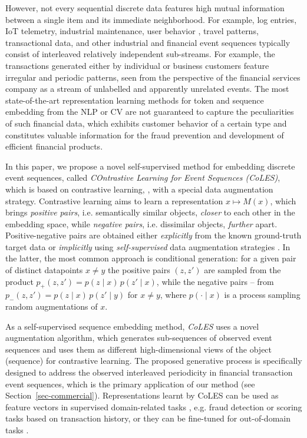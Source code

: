 \documentclass[sigconf, anonymous]{acmart}
\begin{document}
However, not every sequential discrete data features high mutual information between a single
item and its immediate neighborhood. For example, log entries, IoT telemetry, industrial
maintenance, user behavior \citep{Ni2018PerceiveYU}, travel patterns, transactional data,
and other industrial and financial event sequences typically consist of interleaved relatively
independent sub-streams.
%
For example, the transactions generated either by individual or business customers feature
irregular and periodic patterns, seen from the perspective of the financial services company
as a stream of unlabelled and apparently unrelated events. The most state-of-the-art
representation learning methods for token and sequence embedding from the NLP or CV are
not guaranteed to capture the peculiarities of such financial data, which exhibits customer
behavior of a certain type and constitutes valuable information for the fraud prevention
and development of efficient financial products.

In this paper, we propose a novel self-supervised method for embedding discrete event
sequences, called \emph{COntrastive Learning for Event Sequences (CoLES)}, which is based
on contrastive learning, \citep{Xing2002DistanceML, Hadsell2006DimensionalityRB}, with
a special data augmentation strategy.
% 
Contrastive learning aims to learn a representation $x \mapsto M(x)$, which brings
\emph{positive pairs}, i.e. semantically similar objects, \emph{closer} to each other
in the embedding space, while \emph{negative pairs}, i.e. dissimilar objects, \emph{further}
apart.
%
Positive-negative pairs are obtained either \emph{explicitly} from the known ground-truth
target data or \emph{implicitly} using \emph{self-supervised} data augmentation strategies
\citep{Falcon2020AFF}. In the latter, the most common approach is conditional generation:
for a given pair of distinct datapoints $x \neq y$ the positive pairs $(z, z')$ are sampled
from the product $
  p_+(z, z') = p(z \mid x) \,p(z' \mid x) 
$, while the negative pairs -- from $
  p_-(z, z') = p(z \mid x) \,p(z' \mid y)
$ for $x \neq y$, where $
  p(\cdot \mid x)
$ is a process sampling random augmentations of $x$.

As a self-supervised sequence embedding method, \emph{CoLES} uses a novel augmentation
algorithm, which generates sub-sequences of observed event sequences and uses them as
different high-dimensional views of the object (sequence) for contrastive learning.
%
The proposed generative process is specifically designed to address the observed interleaved
periodicity in financial transaction event sequences, which is the primary application of
our method (see Section~\ref{sec-commercial}). Representations learnt by CoLES can be used as feature vectors
in supervised domain-related tasks \citep{Mikolov2013EfficientEO,Song2017LearningUE,Zhai2019LearningAU},
e.g. fraud detection or scoring tasks based on transaction history, or they can be fine-tuned
for out-of-domain tasks \citep{Yosinski2014HowTA}.
\end{document}
